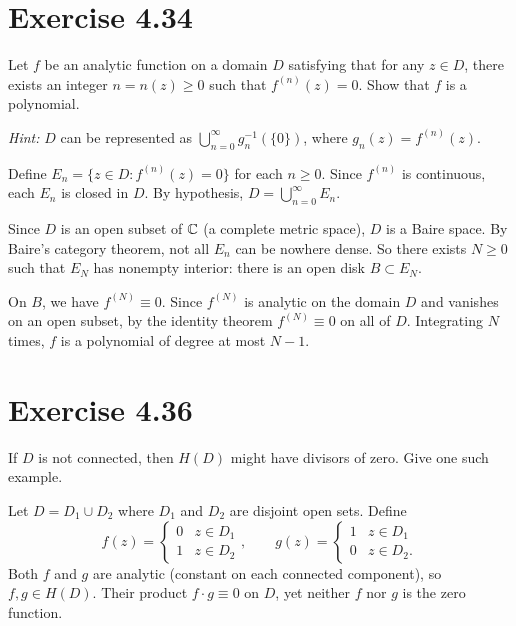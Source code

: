 \documentclass{article}
\begin{document}
\section{Exercise 4.34}

Let $f$ be an analytic function on a domain $D$ satisfying that for
any $z \in D$, there exists an integer $n = n(z) \ge 0$ such that
$f^{(n)}(z) = 0$.  Show that $f$ is a polynomial.

\textit{Hint:} $D$ can be represented as
$\bigcup_{n=0}^{\infty} g_n^{-1}(\{0\})$,
where $g_n(z) = f^{(n)}(z)$.

\begin{solution}
  Define $E_n = \{z \in D : f^{(n)}(z) = 0\}$ for each $n \ge 0$.
  Since $f^{(n)}$ is continuous, each $E_n$ is closed in $D$.
  By hypothesis, $D = \bigcup_{n=0}^{\infty} E_n$.

  Since $D$ is an open subset of $\mathbb{C}$ (a complete metric space),
  $D$ is a Baire space. By Baire's category theorem, not all $E_n$
  can be nowhere dense. So there exists $N \ge 0$ such that $E_N$
  has nonempty interior: there is an open disk $B \subset E_N$.

  On $B$, we have $f^{(N)} \equiv 0$. Since $f^{(N)}$ is analytic
  on the domain $D$ and vanishes on an open subset, by the identity
  theorem $f^{(N)} \equiv 0$ on all of $D$.
  Integrating $N$ times, $f$ is a polynomial of degree at most $N - 1$.
\end{solution}

\section{Exercise 4.36}

If $D$ is not connected, then $H(D)$ might have divisors of zero.
Give one such example.

\begin{solution}
  Let $D = D_1 \cup D_2$ where $D_1$ and $D_2$ are disjoint open
  sets. Define
  \[
    f(z) = \begin{cases} 0 & z \in D_1 \\ 1 & z \in D_2 \end{cases},
    \qquad
    g(z) = \begin{cases} 1 & z \in D_1 \\ 0 & z \in D_2. \end{cases}
  \]
  Both $f$ and $g$ are analytic (constant on each connected component),
  so $f, g \in H(D)$. Their product $f \cdot g \equiv 0$ on $D$,
  yet neither $f$ nor $g$ is the zero function.
\end{solution}
\end{document}
